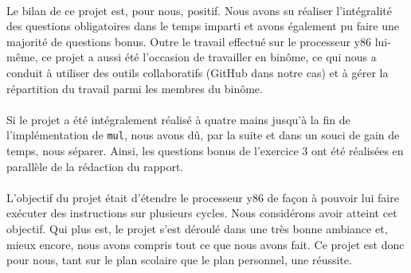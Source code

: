 \documentclass[12pt]{article}
\begin{document}
\paragraph{}Le bilan de ce projet est, pour nous, positif. Nous avons su réaliser l'intégralité des questions obligatoires dans le temps imparti et avons également pu faire une majorité de questions bonus. Outre le travail effectué sur le processeur y86 lui-même, ce projet a aussi été l'occasion de travailler en binôme, ce qui nous a conduit à utiliser des outils collaboratifs (GitHub dans notre cas) et à gérer la répartition du travail parmi les membres du binôme.

\paragraph{}Si le projet a été intégralement réalisé à quatre mains jusqu'à la fin de l'implémentation de \verb+mul+, nous avons dû, par la suite et dans un souci de gain de temps, nous séparer. Ainsi, les questions bonus de l'exercice 3 ont été réalisées en parallèle de la rédaction du rapport.

\paragraph{}L'objectif du projet était d'étendre le processeur y86 de façon à pouvoir lui faire exécuter des instructions sur plusieurs cycles. Nous considérons avoir atteint cet objectif. Qui plus est, le projet s'est déroulé dans une très bonne ambiance et, mieux encore, nous avons compris tout ce que nous avons fait. Ce projet est donc pour nous, tant sur le plan scolaire que le plan personnel, une réussite.
\end{document}

